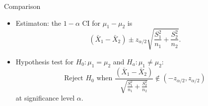 \documentclass{beamer}
\newcommand{\ignore}[1]{}
\let\thefootnote\relax\footnotetext{\tiny{*  Office Hours: Wed \& Fri 10:00 - 11:30 AM, KMC 8-174}}
\begin{document}
\begin{frame}{Comparison}
\begin{itemize}
\item Estimaton: the $1-\alpha$ CI for $\mu_1 - \mu_2$ is 
$$
(\bar X_1 -\bar X_2) \pm z_{\alpha/2} \sqrt{\frac{S_1^2}{n_1} + \frac{S_2^2}{n_2} }.
$$
\item Hypothesis test for $H_0: \mu_1 = \mu_2$ and  $H_a: \mu_1 \ne \mu_2$:
$$
\text{Reject $H_0$ when } 
\frac{(\bar X_1 -\bar X_2) }{\sqrt{\frac{S_1^2}{n_1} + \frac{S_2^2}{n_2} }} \not \in (-z_{\alpha/2},z_{\alpha/2})
$$
at significance level $\alpha$.
\end{itemize}
\end{frame}


\ignore{
\begin{frame}{Time Series Plot}
\begin{figure}
    \caption{}
    \texttt{[image: figures/coindesk-bpi-chart]}
\end{figure}
\let\thefootnote\relax\footnotetext{\tiny{* Plot from Coindesk.com}}
\end{frame}

\begin{frame}{}
\begin{itemize}
\item 
\end{itemize}
\end{frame}

\vspace{\stretch{0.5}}

\begin{block}{}
\end{block}


}
\end{document}
